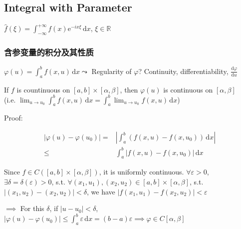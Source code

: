 \subsection[含参变量的积分]{Integral with Parameter}

$\hat{f}(\xi)=\int_{-\infty}^{+\infty}f(x)\mathrm{e}^{-ix\xi}\,\mathrm{d}x$, $\xi\in\mathbb{R}$

\subsubsection{含参变量的积分及其性质}

$\varphi(u)=\int_a^bf(x,u)\,\mathrm{d}x\leadsto$ Regularity of $\varphi$? Continuity, differentiability, $\frac{\mathrm{d}\varphi}{\mathrm{d}u}$

\begin{theorem}
    If $f$ is countinuous on $[a,b]\times[\alpha,\beta]$, then $\varphi(u)$ is continuous on $[\alpha,\beta]$\\
    (i.e. $\lim_{u\to u_0}\int_a^bf(x,u)\,\mathrm{d}x=\int_a^b\lim_{u\to u_0}f(x,u)\,\mathrm{d}x$)
\end{theorem}

Proof:

\begin{align*}
    \left|\varphi(u)-\varphi(u_0)\right|= & \left|\int_a^b\left(f(x,u)-f(x,u_0)\right)\,\mathrm{d}x\right| \\
    \leq                                  & \int_a^b\left|f(x,u)-f(x,u_0)\right|\,\mathrm{d}x
\end{align*}

Since $f\in C([a,b]\times[\alpha,\beta])$, it is uniformly continuous. $\forall\varepsilon>0$, $\exists\delta=\delta(\varepsilon)>0$, s.t. $\forall(x_1,u_1),(x_2,u_2)\in[a,b]\times[\alpha,\beta]$, s.t. $\left|(x_1,u_2)-(x_2,u_2)\right|<\delta$, we have $\left|f(x_1,u_1)-f(x_2,u_2)\right|<\varepsilon$

$\implies$ For this $\delta$, if $\left|u-u_0\right|<\delta$, $\left|\varphi(u)-\varphi(u_0)\right|\leq\int_a^b\varepsilon\,\mathrm{d}x=(b-a)\varepsilon\implies\varphi\in C[\alpha,\beta]$

